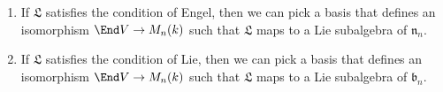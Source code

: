 \begin{enumerate}[label=(\alph*)]
	\item If $\mathfrak{L}$ satisfies the condition of Engel, then we can pick
		a basis that defines an isomorphism $\End V\to M_n(k)$ such that
		$\mathfrak{L}$ maps to a Lie subalgebra of $\mathfrak{n}_n$.

	\item If $\mathfrak{L}$ satisfies the condition of Lie, then we can pick
		a basis that defines an isomorphism $\End V\to M_n(k)$ such that
		$\mathfrak{L}$ maps to a Lie subalgebra of $\mathfrak{b}_n$.
\end{enumerate}
